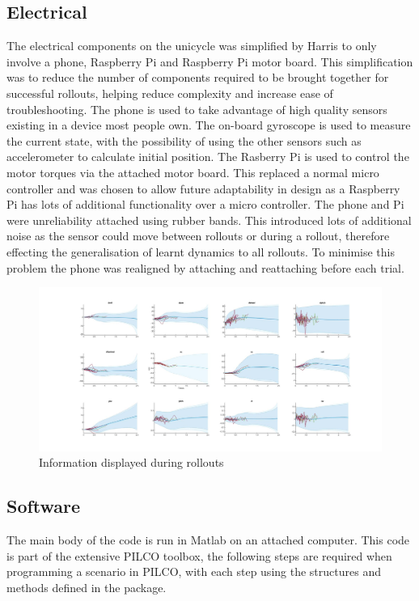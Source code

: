 \documentclass[twoside,twocolumn,12pt]{article}
\begin{document}
\subsection{Electrical}
The electrical components on the unicycle was simplified by Harris \cite{arsalan} to only involve a phone, Raspberry Pi and Raspberry Pi motor board. This simplification was to reduce the number of components required to be brought together for successful rollouts, helping reduce complexity and increase ease of troubleshooting. 
\newline
The phone is used to take advantage of high quality sensors existing in a device most people own. The on-board gyroscope is used to measure the current state, with the possibility of using the other sensors such as accelerometer to calculate initial position. 
\newline
The Rasberry Pi is used to control the motor torques via the attached motor board. This replaced a normal micro controller and was chosen to allow future adaptability in design as a Raspberry Pi has lots of additional functionality over a micro controller.
\newline
The phone and Pi were unreliability attached using rubber bands. This introduced lots of additional noise as the sensor could move between rollouts or during a rollout, therefore effecting the generalisation of learnt dynamics to all rollouts. To minimise this problem the phone was realigned by attaching and reattaching before each trial. 
\begin{figure}[t!]
  \centering
    \includegraphics[width=\linewidth]{pilco1}
   \caption{Information displayed during rollouts}
  \label{fig:pilcoscreen}
\end{figure}
\subsection{Software}
The main body of the code is run in Matlab on an attached computer. This code is part of the extensive PILCO toolbox, the following steps are required when programming a scenario in PILCO, with each step using the structures and methods defined in the package.
\end{document}
